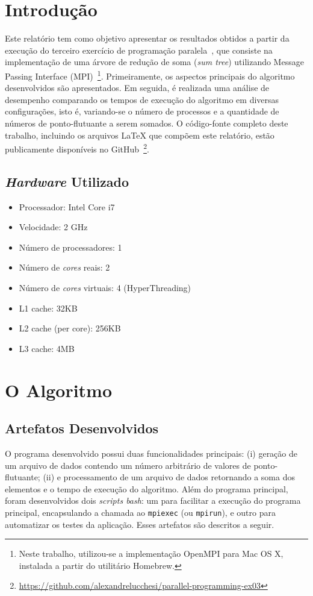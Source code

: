 \documentclass[12pt,a4paper]{article}
\begin{document}


\section{Introdução}
Este relatório tem como objetivo apresentar os resultados obtidos a partir da
execução do terceiro exercício de programação paralela~\cite{exercise}, que
consiste na implementação de uma árvore de redução de soma (\textit{sum tree})
utilizando Message Passing Interface (MPI)~\footnote{Neste trabalho, utilizou-se
a implementação OpenMPI para Mac OS X, instalada a partir do utilitário
Homebrew.}. Primeiramente, os aspectos principais do algoritmo desenvolvidos são
apresentados. Em seguida, é realizada uma análise de desempenho comparando os
tempos de execução do algoritmo em diversas configurações, isto é, variando-se o
número de processos e a quantidade de números de ponto-flutuante a serem
somados. O código-fonte completo deste trabalho, incluindo os arquivos
\LaTeX\xspace que compõem este relatório, estão publicamente disponíveis no
GitHub~\footnote{\url{https://github.com/alexandrelucchesi/parallel-programming-ex03}}.

\subsection{\textit{Hardware} Utilizado}
\label{sec:hardware}

\begin{itemize}
    \item Processador: Intel Core i7
    \item Velocidade: 2 GHz
    \item Número de processadores: 1
    \item Número de \textit{cores} reais: 2
    \item Número de \textit{cores} virtuais: 4 (HyperThreading)
    \item L1 cache: 32KB
    \item L2 cache (per core): 256KB
    \item L3 cache: 4MB
\end{itemize}


\section{O Algoritmo}


\subsection{Artefatos Desenvolvidos}
O programa desenvolvido possui duas funcionalidades principais: (i) geração de
um arquivo de dados contendo um número arbitrário de valores de ponto-flutuante;
(ii) e processamento de um arquivo de dados retornando a soma dos elementos e o
tempo de execução do algoritmo. Além do programa principal, foram desenvolvidos
dois \textit{scripts bash}: um para facilitar a execução do programa principal,
encapsulando a chamada ao \texttt{mpiexec} (ou \texttt{mpirun}), e outro para
automatizar os testes da aplicação. Esses artefatos são descritos a seguir.
\end{document}
